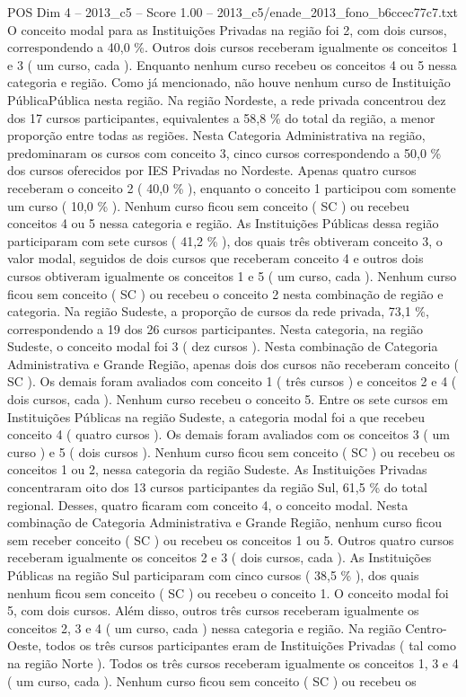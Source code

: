 \begin{textsample}{POS Dim 4 – 2013\_c5 – Score 1.00 – 2013\_c5/enade\_2013\_fono\_b6ccec77c7.txt}
O conceito modal para as Instituições Privadas na região foi 2, com dois cursos, correspondendo a 40,0 \%.
Outros dois cursos receberam igualmente os conceitos 1 e 3 ( um curso, cada ).
Enquanto nenhum curso recebeu os conceitos 4 ou 5 nessa categoria e região.
Como já mencionado, não houve nenhum curso de Instituição PúblicaPública nesta região.
Na região Nordeste, a rede privada concentrou dez dos 17 cursos participantes, equivalentes a 58,8 \% do total da região, a menor proporção entre todas as regiões.
Nesta Categoria Administrativa na região, predominaram os cursos com conceito 3, cinco cursos correspondendo a 50,0 \% dos cursos oferecidos por IES Privadas no Nordeste.
Apenas quatro cursos receberam o conceito 2 ( 40,0 \% ), enquanto o conceito 1 participou com somente um curso ( 10,0 \% ).
Nenhum curso ficou sem conceito ( SC ) ou recebeu conceitos 4 ou 5 nessa categoria e região.
As Instituições Públicas dessa região participaram com sete cursos ( 41,2 \% ), dos quais três obtiveram conceito 3, o valor modal, seguidos de dois cursos que receberam conceito 4 e outros dois cursos obtiveram igualmente os conceitos 1 e 5 ( um curso, cada ).
Nenhum curso ficou sem conceito ( SC ) ou recebeu o conceito 2 nesta combinação de região e categoria.
Na região Sudeste, a proporção de cursos da rede privada, 73,1 \%, correspondendo a 19 dos 26 cursos participantes.
Nesta categoria, na região Sudeste, o conceito modal foi 3 ( dez cursos ).
Nesta combinação de Categoria Administrativa e Grande Região, apenas dois dos cursos não receberam conceito ( SC ).
Os demais foram avaliados com conceito 1 ( três cursos ) e conceitos 2 e 4 ( dois cursos, cada ).
Nenhum curso recebeu o conceito 5.
Entre os sete cursos em Instituições Públicas na região Sudeste, a categoria modal foi a que recebeu conceito 4 ( quatro cursos ).
Os demais foram avaliados com os conceitos 3 ( um curso ) e 5 ( dois cursos ).
Nenhum curso ficou sem conceito ( SC ) ou recebeu os conceitos 1 ou 2, nessa categoria da região Sudeste.
As Instituições Privadas concentraram oito dos 13 cursos participantes da região Sul, 61,5 \% do total regional.
Desses, quatro ficaram com conceito 4, o conceito modal.
Nesta combinação de Categoria Administrativa e Grande Região, nenhum curso ficou sem receber conceito ( SC ) ou recebeu os conceitos 1 ou 5.
Outros quatro cursos receberam igualmente os conceitos 2 e 3 ( dois cursos, cada ).
As Instituições Públicas na região Sul participaram com cinco cursos ( 38,5 \% ), dos quais nenhum ficou sem conceito ( SC ) ou recebeu o conceito 1.
O conceito modal foi 5, com dois cursos.
Além disso, outros três cursos receberam igualmente os conceitos 2, 3 e 4 ( um curso, cada ) nessa categoria e região.
Na região Centro-Oeste, todos os três cursos participantes eram de Instituições Privadas ( tal como na região Norte ).
Todos os três cursos receberam igualmente os conceitos 1, 3 e 4 ( um curso, cada ).
Nenhum curso ficou sem conceito ( SC ) ou recebeu os

\end{textsample}
